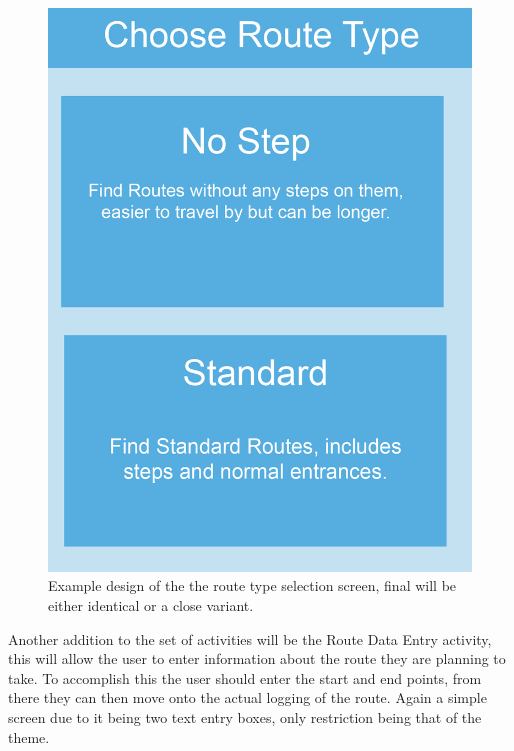 \begin{figure}[H]
\includegraphics[scale=0.5]{Chapter2/crt.png} 
\caption[Route Type Example]{Example design of the the route type selection screen, final will be either identical or a close variant.}
\end{figure}

Another addition to the set of activities will be the Route Data Entry activity, this will allow the user to enter information about the route they are planning to take. To accomplish this the user should enter the start and end points, from there they can then move onto the actual logging of the route. Again a simple screen due to it being two text entry boxes, only restriction being that of the theme.

